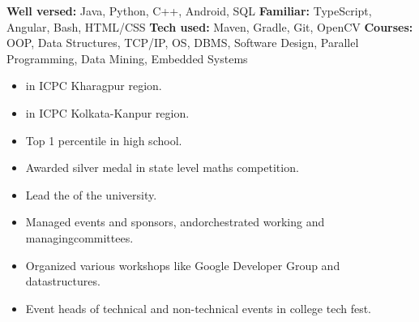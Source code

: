 \textbf{Well versed:} Java, Python, C++, Android, SQL\newline
\textbf{Familiar:} TypeScript, Angular, Bash, HTML/CSS\newline
\textbf{Tech used:} Maven, Gradle, Git, OpenCV\newline
\textbf{Courses:} OOP, Data Structures, TCP/IP, OS, DBMS, Software Design, Parallel
Programming, Data Mining, Embedded Systems


\begin{itemize}
    \item {}in ICPC Kharagpur region.
    \item {}in ICPC Kolkata-Kanpur region.
 \end{itemize}
 \begin{itemize}
    \item Top 1 percentile in high school.
    \item Awarded silver medal in state level maths competition.
 \end{itemize}



\begin{itemize}
    \item Lead the of the university.
    \item Managed events and sponsors, and\newline orchestrated working and managing\newline committees.
    \item Organized various workshops like Google Developer Group and datastructures.
 \end{itemize}
\begin{itemize}
    \item Event heads of technical and non-technical events in college tech fest.
 \end{itemize}


